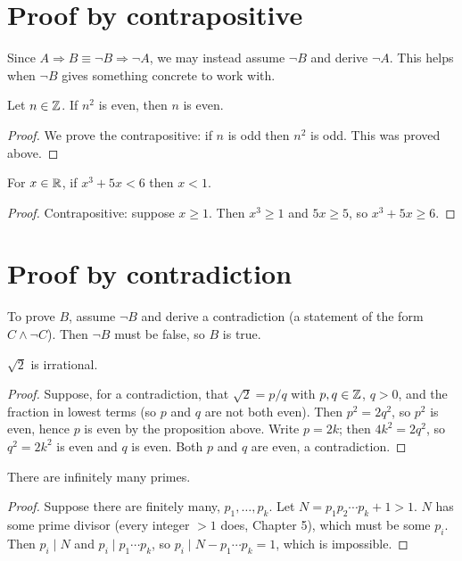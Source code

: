 \section{Proof by contrapositive}

Since $A \Rightarrow B \equiv \neg B \Rightarrow \neg A$, we may instead assume $\neg B$ and
derive $\neg A$. This helps when $\neg B$ gives something concrete to work with.

\begin{proposition}
Let $n \in \mathbb{Z}$. If $n^2$ is even, then $n$ is even.
\end{proposition}
\begin{proof}
We prove the contrapositive: if $n$ is odd then $n^2$ is odd. This was proved above.
\end{proof}

\begin{proposition}
For $x \in \mathbb{R}$, if $x^3 + 5x < 6$ then $x < 1$.
\end{proposition}
\begin{proof}
Contrapositive: suppose $x \geq 1$. Then $x^3 \ge 1$ and $5x \ge 5$, so $x^3 + 5x \ge 6$.
\end{proof}

\section{Proof by contradiction}

To prove $B$, assume $\neg B$ and derive a contradiction (a statement of the form $C\wedge
\neg C$). Then $\neg B$ must be false, so $B$ is true.

\begin{theorem}
$\sqrt 2$ is irrational.
\end{theorem}
\begin{proof}
Suppose, for a contradiction, that $\sqrt 2 = p/q$ with $p,q \in \mathbb{Z}$, $q > 0$, and the fraction
in lowest terms (so $p$ and $q$ are not both even). Then $p^2 = 2q^2$, so $p^2$ is even, hence
$p$ is even by the proposition above. Write $p = 2k$; then $4k^2 = 2q^2$, so $q^2 = 2k^2$ is
even and $q$ is even. Both $p$ and $q$ are even, a contradiction.
\end{proof}

\begin{theorem}[Euclid]
There are infinitely many primes.
\end{theorem}
\begin{proof}
Suppose there are finitely many, $p_1,\dots,p_k$. Let $N = p_1p_2\cdots p_k + 1 > 1$. $N$ has
some prime divisor (every integer $>1$ does, Chapter 5), which must be some $p_i$. Then $p_i
\mid N$ and $p_i \mid p_1 \cdots p_k$, so $p_i \mid N - p_1\cdots p_k = 1$, which is impossible.
\end{proof}


